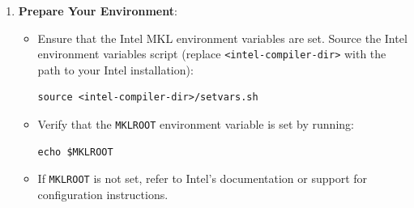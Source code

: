 \documentclass[a4paper,12pt]{article}
\begin{document}
\begin{enumerate}
    \item \textbf{Prepare Your Environment}:
        \begin{itemize}
            \item Ensure that the Intel MKL environment variables are set. Source the Intel environment variables script (replace \texttt{<intel-compiler-dir>} with the path to your Intel installation):
            \begin{verbatim}
source <intel-compiler-dir>/setvars.sh
            \end{verbatim}
            \item Verify that the \texttt{MKLROOT} environment variable is set by running:
            \begin{verbatim}
echo $MKLROOT
            \end{verbatim}
            \item If \texttt{MKLROOT} is not set, refer to Intel’s documentation or support for configuration instructions.
        \end{itemize}


\end{enumerate}
\end{document}
